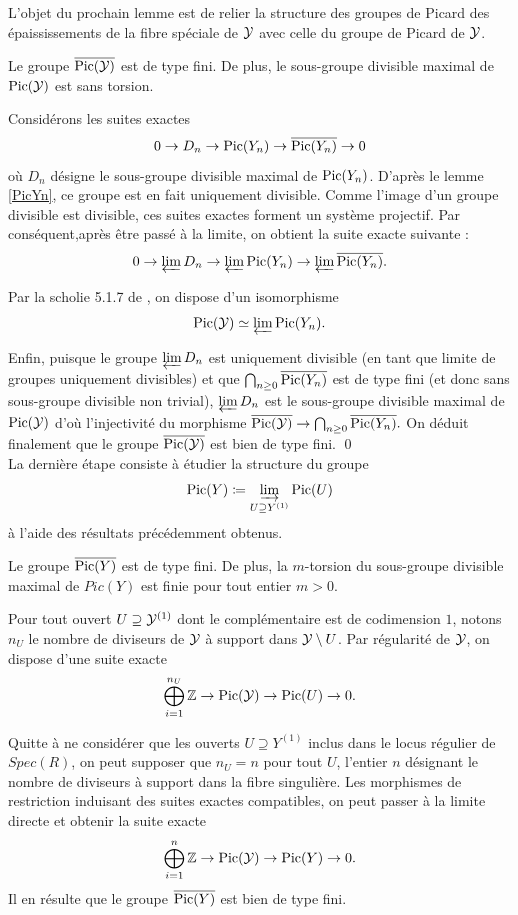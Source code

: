 \documentclass[11pt]{article}
\begin{document}
L'objet du prochain lemme est de relier la structure des groupes de Picard des épaississements de la fibre spéciale de $\mathcal{Y}$ avec celle du groupe de Picard de $\mathcal{Y}$.

\begin{lemme}\label{lemPicfini}
Le groupe $\overline{\operatorname{Pic}(\mathcal{Y})}$ est de type fini. De plus, le sous-groupe divisible maximal de $\operatorname{Pic}(\mathcal{Y})$ est sans torsion.
\end{lemme}

\proof
Considérons les suites exactes
$$
0 \rightarrow D_n \rightarrow \operatorname{Pic}(Y_n) \rightarrow \overline{\operatorname{Pic}(Y_n)}  \rightarrow 0
$$
où $D_n$ désigne le sous-groupe divisible maximal de $\operatorname{Pic}(Y_n)$. D'après le lemme \ref{PicYn}, ce groupe est en fait uniquement divisible. Comme l'image d'un groupe divisible est divisible, ces suites exactes forment un système projectif. Par conséquent,après être passé à la limite, on obtient la suite exacte suivante :
$$
0 \rightarrow \varprojlim  D_n \rightarrow  \varprojlim \operatorname{Pic}(Y_n) \rightarrow \varprojlim \overline{\operatorname{Pic}(Y_n)}. 
$$

Par la scholie 5.1.7 de \cite{PMIHES_1961__11__5_0}, on dispose d'un isomorphisme 
$$
\operatorname{Pic}(\mathcal{Y}) \simeq \varprojlim \operatorname{Pic}(Y_n).
$$

Enfin, puisque le groupe $\varprojlim  D_n$ est uniquement divisible (en tant que limite de groupes uniquement divisibles) et que $\bigcap_{n \geq 0} \overline{\operatorname{Pic}(Y_n)}$ est de type fini (et donc sans sous-groupe divisible non trivial), $\varprojlim  D_n$ est le sous-groupe divisible maximal de $\operatorname{Pic}(\mathcal{Y})$ d'où l'injectivité du morphisme $\overline{\operatorname{Pic}(\mathcal{Y})} \rightarrow \bigcap_{n \geq 0} \overline{\operatorname{Pic}(Y_n)}.$ On déduit finalement que le groupe $\overline{\operatorname{Pic}(\mathcal{Y})}$ est bien de type fini. \qed\\


La dernière étape consiste à étudier la structure du groupe
$$\Pic(Y) \coloneqq \drl_{U \supseteq Y^{(1)}} \Pic(U)$$
à l'aide des résultats précédemment obtenus.\\

\begin{prop}\label{propPicfini}
    Le groupe 
$\overline{\operatorname{Pic}(Y)}$ est de type fini. De plus, la $m$-torsion du sous-groupe divisible maximal de $Pic(Y)$ est finie pour tout entier $m>0$. 
\end{prop}
\proof Pour tout ouvert $U \supseteq \mathcal{Y}^{(1)}$ dont le complémentaire est de codimension $1$, notons $n_U$ le nombre de diviseurs de $\mathcal{Y}$ à support dans $\mathcal{Y} \setminus U$. Par régularité de $\mathcal{Y}$, on dispose d'une suite exacte
$$
\bigoplus_{i=1}^{n_U} \mathbb{Z} \rightarrow \operatorname{Pic}(\mathcal{Y}) \rightarrow \operatorname{Pic}(U) \rightarrow 0.
$$

Quitte à ne considérer que les ouverts $U \supseteq Y^{(1)}$ inclus dans le locus régulier de $Spec(R)$, on peut supposer que $n_U=n$ pour tout $U$, l'entier $n$ désignant le nombre de diviseurs à support dans la fibre singulière.
Les morphismes de restriction induisant des suites exactes compatibles, on peut passer à la limite directe et obtenir la suite exacte
$$
\bigoplus_{i=1}^n \mathbb{Z} \rightarrow \operatorname{Pic}(\mathcal{Y}) \rightarrow \operatorname{Pic}(Y) \rightarrow 0.
$$
Il en résulte que le groupe $\overline{\operatorname{Pic}(Y)}$ est bien de type fini.\\
\end{document}
